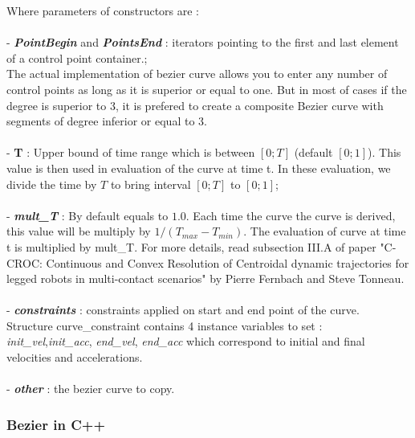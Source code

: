 \documentclass{article}
\begin{document}
    \noindent
    Where parameters of constructors are : \\\\
    - \textbf{\textit{PointBegin}} and \textbf{\textit{PointsEnd}} : iterators pointing to the first and last element of a control point container.;\\ The actual implementation of bezier curve allows you to enter any number of control points as long as it is superior or equal to one. But in most of cases if the degree is superior to 3, it is prefered to create a composite Bezier curve with segments of degree inferior or equal to 3.\\\\
    - \textbf{T} : Upper bound of time range which is between $[0;T]$ (default $[0;1]$). This value is then used in evaluation of the curve at time t. In these evaluation, we divide the time by $T$ to bring interval $[0;T]$ to $[0;1]$;\\\\
    - \textbf{\textit{mult\_T}} : By default equals to $1.0$. Each time the curve the curve is derived, this value will be multiply by $1/(T_{max}-T_{min})$. The evaluation of curve at time t is multiplied by mult\_T. For more details, read subsection III.A of paper "C-CROC: Continuous and Convex Resolution of Centroidal dynamic trajectories for legged robots in multi-contact scenarios" by Pierre Fernbach and Steve Tonneau.\\\\
    - \textbf{\textit{constraints}} : constraints applied on start and end point of the curve.\\
    Structure curve\_constraint contains 4 instance variables to set : \textit{init\_vel},\textit{init\_acc}, \textit{end\_vel}, \textit{end\_acc} which correspond to initial and final velocities and accelerations.\\\\
    - \textbf{\textit{other}} : the bezier curve to copy.
    
    \subsubsection{Bezier in C++}
    
\end{document}
